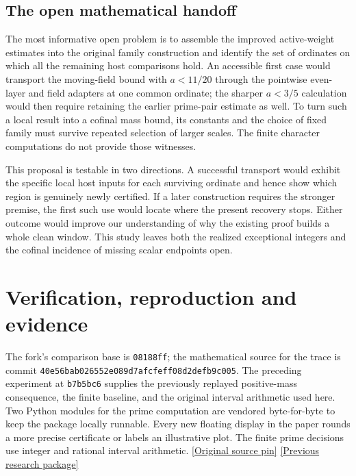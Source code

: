 \documentclass[12pt,letterpaper]{article}
\begin{document}
\subsection{The open mathematical handoff}
The most informative open problem is to assemble the improved active-weight estimates into the original family construction and identify the set of ordinates on which all the remaining host comparisons hold. An accessible first case would transport the moving-field bound with \(a<11/20\) through the pointwise even-layer and field adapters at one common ordinate; the sharper \(a<3/5\) calculation would then require retaining the earlier prime-pair estimate as well. To turn such a local result into a cofinal mass bound, its constants and the choice of fixed family must survive repeated selection of larger scales. The finite character computations do not provide those witnesses.

This proposal is testable in two directions. A successful transport would exhibit the specific local host inputs for each surviving ordinate and hence show which region is genuinely newly certified. If a later construction requires the stronger premise, the first such use would locate where the present recovery stops. Either outcome would improve our understanding of why the existing proof builds a whole clean window. This study leaves both the realized exceptional integers and the cofinal incidence of missing scalar endpoints open.

\appendix
\section{Verification, reproduction and evidence}
The fork's comparison base is \texttt{08188ff}; the mathematical source for the trace is commit \texttt{40e56bab026552e089d7afcfeff08d2defb9c005}. The preceding experiment at \texttt{b7b5bc6} supplies the previously replayed positive-mass consequence, the finite baseline, and the original interval arithmetic used here. Two Python modules for the prime computation are vendored byte-for-byte to keep the package locally runnable. Every new floating display in the paper rounds a more precise certificate or labels an illustrative plot. The finite prime decisions use integer and rational interval arithmetic. \href{https://github.com/nousentllc/riemann-hypothesis/tree/40e56bab026552e089d7afcfeff08d2defb9c005}{[Original source pin]} \href{https://github.com/nousentllc/riemann-hypothesis/tree/b7b5bc6e5e6814f654753fcbd5f45fecf370344c/research/uriel/experiments/zero-and-arithmetic-windows}{[Previous research package]}
\end{document}
